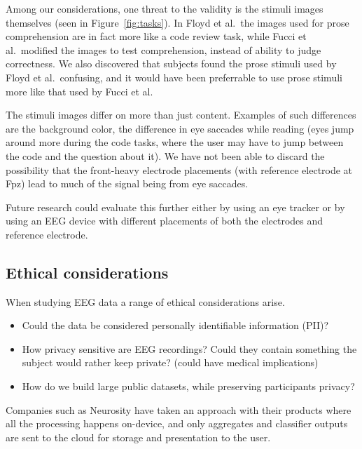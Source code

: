    Among our considerations, one threat to the validity is the stimuli images themselves (seen in Figure~\ref{fig:tasks}). In Floyd et al.~the images used for prose comprehension are in fact more like a code review task, while Fucci et al.~modified the images to test comprehension, instead of ability to judge correctness. We also discovered that subjects found the prose stimuli used by Floyd et al.~confusing, and it would have been preferrable to use prose stimuli more like that used by Fucci et al.

    The stimuli images differ on more than just content. Examples of such differences are the background color, the difference in eye saccades while reading (eyes jump around more during the code tasks, where the user may have to jump between the code and the question about it). We have not been able to discard the possibility that the front-heavy electrode placements (with reference electrode at Fpz) lead to much of the signal being from eye saccades. 

    Future research could evaluate this further either by using an eye tracker or by using an EEG device with different placements of both the electrodes and reference electrode.


\subsection{Ethical considerations}

    When studying EEG data a range of ethical considerations arise. 

    \begin{itemize}
        \item Could the data be considered personally identifiable information (PII)? 
        \item How privacy sensitive are EEG recordings? Could they contain something the subject would rather keep private? (could have medical implications)
        \item How do we build large public datasets, while preserving participants privacy?
    \end{itemize}

    Companies such as Neurosity have taken an approach with their products where all the processing happens on-device, and only aggregates and classifier outputs are sent to the cloud for storage and presentation to the user.


